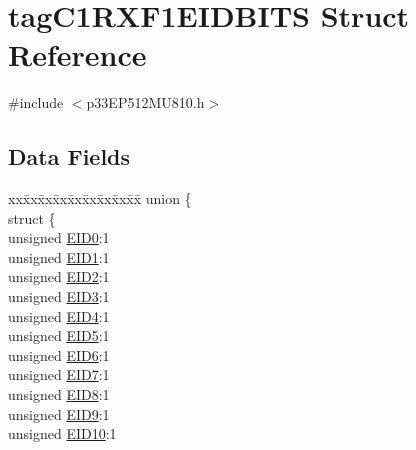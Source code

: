 \hypertarget{structtag_c1_r_x_f1_e_i_d_b_i_t_s}{}\section{tag\+C1\+R\+X\+F1\+E\+I\+D\+B\+I\+TS Struct Reference}
\label{structtag_c1_r_x_f1_e_i_d_b_i_t_s}


{\ttfamily \#include $<$p33\+E\+P512\+M\+U810.\+h$>$}

\subsection*{Data Fields}
\begin{DoxyCompactItemize}
\item 
\begin{tabbing}
xx\=xx\=xx\=xx\=xx\=xx\=xx\=xx\=xx\=\kill
union \{\\
\>struct \{\\
\>\>unsigned \hyperlink{structtag_c1_r_x_f1_e_i_d_b_i_t_s_a9da8b7b30247e4f9cd8cc056549aa9fd}{EID0}:1\\
\>\>unsigned \hyperlink{structtag_c1_r_x_f1_e_i_d_b_i_t_s_afd6c139491d147c1262f3d051c6691e9}{EID1}:1\\
\>\>unsigned \hyperlink{structtag_c1_r_x_f1_e_i_d_b_i_t_s_a36ec62d8d3c5acd5d15e6691dc099a94}{EID2}:1\\
\>\>unsigned \hyperlink{structtag_c1_r_x_f1_e_i_d_b_i_t_s_ab895f7d0ac289a0383b607cbc62eebe2}{EID3}:1\\
\>\>unsigned \hyperlink{structtag_c1_r_x_f1_e_i_d_b_i_t_s_a136d5a709d6618d40acceccb43036656}{EID4}:1\\
\>\>unsigned \hyperlink{structtag_c1_r_x_f1_e_i_d_b_i_t_s_a8dffb2d86a6c184df505ae7c71a58710}{EID5}:1\\
\>\>unsigned \hyperlink{structtag_c1_r_x_f1_e_i_d_b_i_t_s_af8a8574102515d8f1a4b7fd1685d0532}{EID6}:1\\
\>\>unsigned \hyperlink{structtag_c1_r_x_f1_e_i_d_b_i_t_s_a84c3262e67f8d5fd387ac10bde6fa9b1}{EID7}:1\\
\>\>unsigned \hyperlink{structtag_c1_r_x_f1_e_i_d_b_i_t_s_acca25e0b7d86eb499d01f85222baea87}{EID8}:1\\
\>\>unsigned \hyperlink{structtag_c1_r_x_f1_e_i_d_b_i_t_s_ac6748f73d4ada8538b06548be4f396c2}{EID9}:1\\
\>\>unsigned \hyperlink{structtag_c1_r_x_f1_e_i_d_b_i_t_s_a9cea8e77ecbb72bd3b08102412793725}{EID10}:1\\

\end{tabbing}
\end{DoxyCompactItemize}
